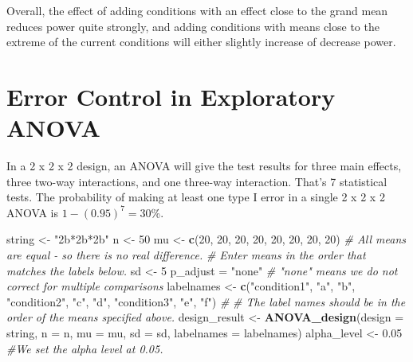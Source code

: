 \documentclass[
]{book}
\newenvironment{Shaded}{\begin{snugshade}}{\end{snugshade}}
\newcommand{\CommentTok}[1]{\textcolor[rgb]{0.56,0.35,0.01}{\textit{#1}}}
\newcommand{\DataTypeTok}[1]{\textcolor[rgb]{0.13,0.29,0.53}{#1}}
\newcommand{\DecValTok}[1]{\textcolor[rgb]{0.00,0.00,0.81}{#1}}
\newcommand{\FloatTok}[1]{\textcolor[rgb]{0.00,0.00,0.81}{#1}}
\newcommand{\KeywordTok}[1]{\textcolor[rgb]{0.13,0.29,0.53}{\textbf{#1}}}
\newcommand{\NormalTok}[1]{#1}
\newcommand{\StringTok}[1]{\textcolor[rgb]{0.31,0.60,0.02}{#1}}
\begin{document}
Overall, the effect of adding conditions with an effect close to the grand mean reduces power quite strongly, and adding conditions with means close to the extreme of the current conditions will either slightly increase of decrease power.

\hypertarget{error-control-in-exploratory-anova}{%
\chapter{Error Control in Exploratory ANOVA}\label{error-control-in-exploratory-anova}}

In a 2 x 2 x 2 design, an ANOVA will give the test results for three main effects, three two-way interactions, and one three-way interaction. That's 7 statistical tests. The probability of making at least one type I error in a single 2 x 2 x 2 ANOVA is \(1-(0.95)^7 = 30\)\%.

\begin{Shaded}
\begin{Highlighting}[]
\NormalTok{string <-}\StringTok{ "2b*2b*2b"}
\NormalTok{n <-}\StringTok{ }\DecValTok{50}
\NormalTok{mu <-}\StringTok{ }\KeywordTok{c}\NormalTok{(}\DecValTok{20}\NormalTok{, }\DecValTok{20}\NormalTok{, }\DecValTok{20}\NormalTok{, }\DecValTok{20}\NormalTok{, }\DecValTok{20}\NormalTok{, }\DecValTok{20}\NormalTok{, }\DecValTok{20}\NormalTok{, }\DecValTok{20}\NormalTok{) }
\CommentTok{# All means are equal - so there is no real difference.}
\CommentTok{# Enter means in the order that matches the labels below.}
\NormalTok{sd <-}\StringTok{ }\DecValTok{5}
\NormalTok{p_adjust =}\StringTok{ "none"}
\CommentTok{# "none" means we do not correct for multiple comparisons}
\NormalTok{labelnames <-}\StringTok{ }\KeywordTok{c}\NormalTok{(}\StringTok{"condition1"}\NormalTok{, }\StringTok{"a"}\NormalTok{, }\StringTok{"b"}\NormalTok{, }
                \StringTok{"condition2"}\NormalTok{, }\StringTok{"c"}\NormalTok{, }\StringTok{"d"}\NormalTok{, }
                \StringTok{"condition3"}\NormalTok{, }\StringTok{"e"}\NormalTok{, }\StringTok{"f"}\NormalTok{) }\CommentTok{#}
\CommentTok{# The label names should be in the order of the means specified above.}
\NormalTok{design_result <-}\StringTok{ }\KeywordTok{ANOVA_design}\NormalTok{(}\DataTypeTok{design =}\NormalTok{ string,}
                   \DataTypeTok{n =}\NormalTok{ n, }
                   \DataTypeTok{mu =}\NormalTok{ mu, }
                   \DataTypeTok{sd =}\NormalTok{ sd, }
                   \DataTypeTok{labelnames =}\NormalTok{ labelnames)}
\NormalTok{alpha_level <-}\StringTok{ }\FloatTok{0.05}
\CommentTok{#We set the alpha level at 0.05. }
\end{Highlighting}
\end{Shaded}
\end{document}
